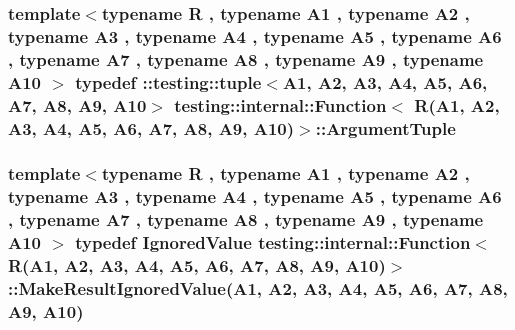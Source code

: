 \subsubsection[{\texorpdfstring{Argument\+Tuple}{ArgumentTuple}}]{\setlength{\rightskip}{0pt plus 5cm}template$<$typename R , typename A1 , typename A2 , typename A3 , typename A4 , typename A5 , typename A6 , typename A7 , typename A8 , typename A9 , typename A10 $>$ typedef \+::testing\+::tuple$<$A1, A2, A3, A4, A5, A6, A7, A8, A9, A10$>$ {\bf testing\+::internal\+::\+Function}$<$ R(A1, A2, A3, A4, A5, A6, A7, A8, A9, A10)$>$\+::{\bf Argument\+Tuple}}\hypertarget{structtesting_1_1internal_1_1_function_3_01_r_07_a1_00_01_a2_00_01_a3_00_01_a4_00_01_a5_00_01_a6f6ff91550f0557b7708e490e5002cd35_a38b8a4911806458eacc69740d4638d87}{}\label{structtesting_1_1internal_1_1_function_3_01_r_07_a1_00_01_a2_00_01_a3_00_01_a4_00_01_a5_00_01_a6f6ff91550f0557b7708e490e5002cd35_a38b8a4911806458eacc69740d4638d87}
\subsubsection[{\texorpdfstring{Make\+Result\+Ignored\+Value}{MakeResultIgnoredValue}}]{\setlength{\rightskip}{0pt plus 5cm}template$<$typename R , typename A1 , typename A2 , typename A3 , typename A4 , typename A5 , typename A6 , typename A7 , typename A8 , typename A9 , typename A10 $>$ typedef {\bf Ignored\+Value} {\bf testing\+::internal\+::\+Function}$<$ R(A1, A2, A3, A4, A5, A6, A7, A8, A9, A10)$>$\+::Make\+Result\+Ignored\+Value(A1, A2, A3, A4, A5, A6, A7, A8, A9, A10)}\hypertarget{structtesting_1_1internal_1_1_function_3_01_r_07_a1_00_01_a2_00_01_a3_00_01_a4_00_01_a5_00_01_a6f6ff91550f0557b7708e490e5002cd35_a4e905802374219aa3e556ccc65191098}{}\label{structtesting_1_1internal_1_1_function_3_01_r_07_a1_00_01_a2_00_01_a3_00_01_a4_00_01_a5_00_01_a6f6ff91550f0557b7708e490e5002cd35_a4e905802374219aa3e556ccc65191098}
